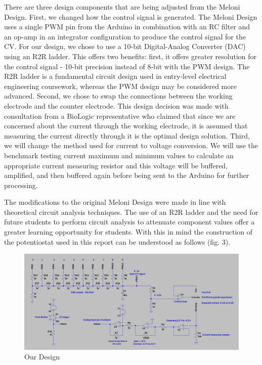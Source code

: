 \documentclass{article}
\begin{document}
There are three design components that are being adjusted from the Meloni Design. First, we changed how the control signal is generated. The Meloni Design uses a single PWM pin from the Arduino in combination with an RC filter and an op-amp in an integrator configuration to produce the control signal for the CV. For our design, we chose to use a 10-bit Digital-Analog Converter (DAC) using an R2R ladder. This offers two benefits: first, it offers greater resolution for the control signal - 10-bit precision instead of 8-bit with the PWM design. The R2R ladder is a fundamental circuit design used in entry-level electrical engineering coursework, whereas the PWM design may be considered more advanced. Second, we chose to swap the connections between the working electrode and the counter electrode. This design decision was made with consultation from a BioLogic representative who claimed that since we are concerned about the current through the working electrode, it is assumed that measuring the current directly through it is the optimal design solution. Third, we will change the method used for current to voltage conversion. We will use the benchmark testing current maximum and minimum values to calculate an appropriate current measuring resistor and this voltage will be buffered, amplified, and then buffered again before being sent to the Arduino for further processing.


The modifications to the original Meloni Design were made in line with theoretical circuit analysis techniques. The use of an R2R ladder and the need for future students to perform circuit analysis to attenuate component values offer a greater learning opportunity for students. With this in mind the construction of the potentiostat used in this report can be understood as follows (fig. 3).


\begin{figure}[h]
\centering
\includegraphics[width=.9\linewidth]{diy_design.png}
\caption{Our Design}
\end{figure}
\end{document}
